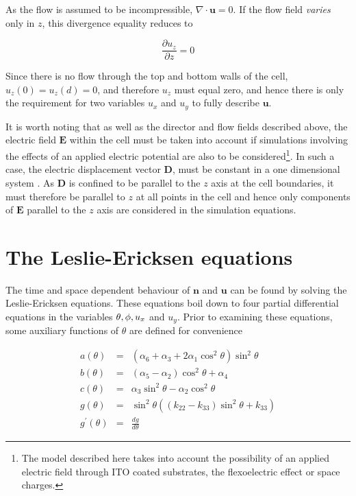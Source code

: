\noindent As the flow is assumed to be incompressible, $\nabla\cdot\mathbf{u}=0$. If the flow field \textit{varies} only in $z$, this divergence equality reduces to 

\begin{equation}
\frac{\partial u_z}{\partial z}=0
\end{equation}

\noindent Since there is no flow through the top and bottom walls of the cell, $u_z\left(0\right)=u_z\left(d\right)=0$, and therefore $u_z$ must equal zero, and hence there is only the requirement for two variables $u_x$ and $u_y$ to fully describe $\mathbf{u}$.

It is worth noting that as well as the director and flow fields described above, the electric field $\mathbf{E}$ within the cell must be taken into account if simulations involving the effects of an applied electric potential are also to be considered\footnote{The model described here takes into account the possibility of an applied electric field through ITO coated substrates, the flexoelectric effect or space charges.}. In such a case, the electric displacement vector $\mathbf{D}$, must be constant in a one dimensional system \cite{Cornford2008}. As $\mathbf{D}$ is confined to be parallel to the $z$ axis at the cell boundaries, it must therefore be parallel to $z$ at all points in the cell and hence only components of $\mathbf{E}$ parallel to the $z$ axis are considered in the simulation equations.

\section{The Leslie-Ericksen equations}
The time and space dependent behaviour of $\mathbf{n}$ and $\mathbf{u}$ can be found by solving the Leslie-Ericksen equations. These equations boil down to four partial differential equations in the variables $\theta,\space\phi,\space u_x$ and $u_y$. Prior to examining these equations, some auxiliary functions of $\theta$ are defined for convenience \cite{Cornford2008}

\begin{eqnarray}
a\left(\theta\right)&=&\left(\alpha_6+\alpha_3+2\alpha_1\cos^2\theta\right)\sin^2\theta\\
b\left(\theta\right)&=&\left(\alpha_5-\alpha_2\right)\cos^2\theta+\alpha_4\\
c\left(\theta\right)&=&\alpha_3\sin^2\theta-\alpha_2\cos^2\theta\\
\label{eq:c}
g\left(\theta\right)&=&\sin^2\theta\left(\left(k_{22}-k_{33}\right)\sin^2\theta+k_{33}\right)\\
g^\prime\left(\theta\right)&=&\frac{dg}{d\theta}
\end{eqnarray}

